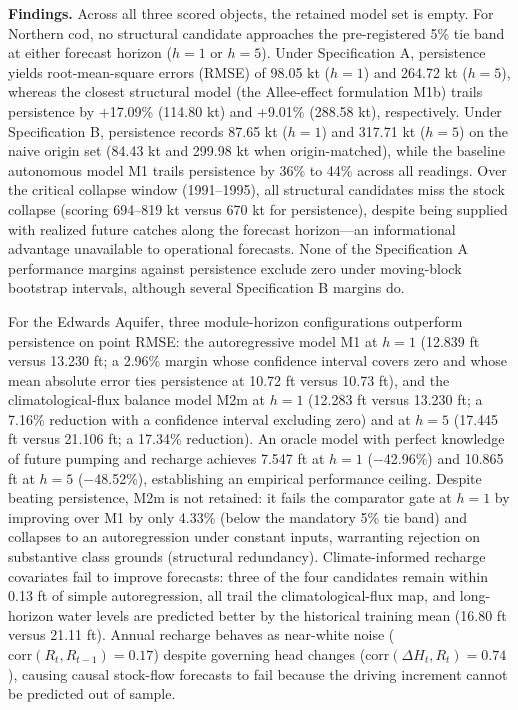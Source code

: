 \documentclass[11pt]{article}
\begin{document}
\textbf{Findings.} Across all three scored objects, the retained model
set is empty. For Northern cod, no structural candidate approaches the
pre-registered 5\% tie band at either forecast horizon (\(h = 1\) or
\(h = 5\)). Under Specification A, persistence yields root-mean-square
errors (RMSE) of 98.05 kt (\(h = 1\)) and 264.72 kt (\(h = 5\)), whereas
the closest structural model (the Allee-effect formulation M1b) trails
persistence by +17.09\% (114.80 kt) and +9.01\% (288.58 kt),
respectively. Under Specification B, persistence records 87.65 kt
(\(h = 1\)) and 317.71 kt (\(h = 5\)) on the naive origin set (84.43 kt
and 299.98 kt when origin-matched), while the baseline autonomous model
M1 trails persistence by 36\% to 44\% across all readings. Over the
critical collapse window (1991--1995), all structural candidates miss
the stock collapse (scoring 694--819 kt versus 670 kt for persistence),
despite being supplied with realized future catches along the forecast
horizon---an informational advantage unavailable to operational
forecasts. None of the Specification A performance margins against
persistence exclude zero under moving-block bootstrap intervals,
although several Specification B margins do.

For the Edwards Aquifer, three module-horizon configurations outperform
persistence on point RMSE: the autoregressive model M1 at \(h = 1\)
(12.839 ft versus 13.230 ft; a 2.96\% margin whose confidence interval
covers zero and whose mean absolute error ties persistence at 10.72 ft
versus 10.73 ft), and the climatological-flux balance model M2m at
\(h = 1\) (12.283 ft versus 13.230 ft; a 7.16\% reduction with a
confidence interval excluding zero) and at \(h = 5\) (17.445 ft versus
21.106 ft; a 17.34\% reduction). An oracle model with perfect knowledge
of future pumping and recharge achieves 7.547 ft at \(h = 1\) (−42.96\%)
and 10.865 ft at \(h = 5\) (−48.52\%), establishing an empirical
performance ceiling. Despite beating persistence, M2m is not retained:
it fails the comparator gate at \(h = 1\) by improving over M1 by only
4.33\% (below the mandatory 5\% tie band) and collapses to an
autoregression under constant inputs, warranting rejection on
substantive class grounds (structural redundancy). Climate-informed
recharge covariates fail to improve forecasts: three of the four
candidates remain within 0.13 ft of simple autoregression, all trail the
climatological-flux map, and long-horizon water levels are predicted
better by the historical training mean (16.80 ft versus 21.11 ft).
Annual recharge behaves as near-white noise
(\(\text{corr}(R_t, R_{t-1}) = 0.17\)) despite governing head changes
(\(\text{corr}(\Delta H_t, R_t) = 0.74\)), causing causal stock-flow
forecasts to fail because the driving increment cannot be predicted out
of sample.
\end{document}
